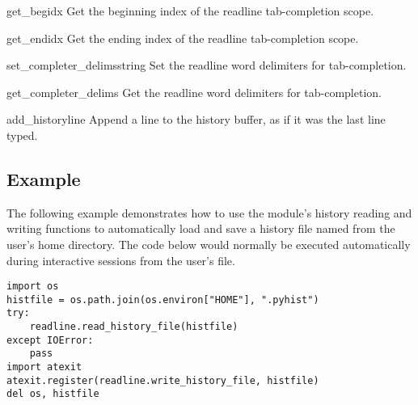 \begin{funcdesc}{get_begidx}{}
Get the beginning index of the readline tab-completion scope.
\end{funcdesc}

\begin{funcdesc}{get_endidx}{}
Get the ending index of the readline tab-completion scope.
\end{funcdesc}

\begin{funcdesc}{set_completer_delims}{string}
Set the readline word delimiters for tab-completion.
\end{funcdesc}

\begin{funcdesc}{get_completer_delims}{}
Get the readline word delimiters for tab-completion.
\end{funcdesc}

\begin{funcdesc}{add_history}{line}
Append a line to the history buffer, as if it was the last line typed.
\end{funcdesc}


\begin{seealso}
\end{seealso}


\subsection{Example \label{readline-example}}

The following example demonstrates how to use the
 module's history reading and writing functions to
automatically load and save a history file named  from
the user's home directory.  The code below would normally be executed
automatically during interactive sessions from the user's
 file.

\begin{verbatim}
import os
histfile = os.path.join(os.environ["HOME"], ".pyhist")
try:
    readline.read_history_file(histfile)
except IOError:
    pass
import atexit
atexit.register(readline.write_history_file, histfile)
del os, histfile
\end{verbatim}
